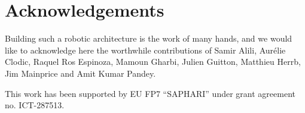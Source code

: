 \documentclass[preprint,3p,times]{elsarticle}
\begin{document}
\section*{Acknowledgements}

Building such a robotic architecture is the work of many hands, and we would
like to acknowledge here the worthwhile contributions of Samir Alili, Aurélie
Clodic, Raquel Ros Espinoza, Mamoun Gharbi, Julien Guitton, Matthieu Herrb, Jim
Mainprice and Amit Kumar Pandey.

This work has been supported by EU FP7 ``SAPHARI'' under grant agreement no.
ICT-287513.



%

\end{document}
